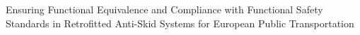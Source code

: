 Ensuring Functional Equivalence and Compliance with Functional Safety Standards in Retrofitted Anti-Skid Systems for European Public Transportation